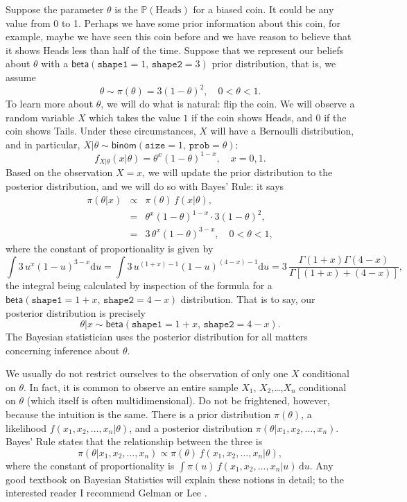 \documentclass[captions=tableheading]{scrbook}
\begin{document}
\begin{example}
Suppose the parameter \(\theta\) is the \(\mathbb{P}(\mbox{Heads})\) for a biased coin. It could be any value from 0 to 1. Perhaps we have some prior information about this coin, for example, maybe we have seen this coin before and we have reason to believe that it shows Heads less than half of the time. Suppose that we represent our beliefs about \(\theta\) with a \(\mathsf{beta}(\mathtt{shape1}=1,\,\mathtt{shape2}=3)\) prior distribution, that is, we assume 
\[
\theta\sim\pi(\theta)=3(1-\theta)^{2},\quad 0 < \theta < 1.
\]
To learn more about \(\theta\), we will do what is natural: flip the coin. We will observe a random variable \(X\) which takes the value \(1\) if the coin shows Heads, and 0 if the coin shows Tails. Under these circumstances, \(X\) will have a Bernoulli distribution, and in particular, \(X|\theta\sim\mathsf{binom}(\mathtt{size}=1,\,\mathtt{prob}=\theta)\):
\[ 
f_{X|\theta}(x|\theta)=\theta^{x}(1-\theta)^{1-x},\quad x=0,1.
\]
Based on the observation \(X=x\), we will update the prior distribution to the posterior distribution, and we will do so with Bayes' Rule: it says
\begin{eqnarray*}
\pi(\theta|x) & \propto & \pi(\theta)\, f(x|\theta),\\
 & = & \theta^{x}(1-\theta)^{1-x}\cdot3(1-\theta)^{2},\\
 & = & 3\,\theta^{x}(1-\theta)^{3-x},\quad 0 < \theta < 1,
\end{eqnarray*}
where the constant of proportionality is given by
\[
\int3\, u^{x}(1-u)^{3-x}\mathrm{d} u=\int3\, u^{(1+x)-1}(1-u)^{(4-x)-1}\mathrm{d} u=3\,\frac{\Gamma(1+x)\Gamma(4-x)}{\Gamma[(1+x)+(4-x)]},
\]
the integral being calculated by inspection of the formula for a \(\mathsf{beta}(\mathtt{shape1}=1+x,\,\mathtt{shape2}=4-x)\) distribution. That is to say, our posterior distribution is precisely
\[
\theta|x\sim\mathsf{beta}(\mathtt{shape1}=1+x,\,\mathtt{shape2}=4-x).
\]
The Bayesian statistician uses the posterior distribution for all matters concerning inference about \(\theta\).

\end{example}

\begin{rem}
We usually do not restrict ourselves to the observation of only one \(X\) conditional on \(\theta\). In fact, it is common to observe an entire sample \(X_{1}\), \(X_{2}\),\ldots{},\(X_{n}\) conditional on \(\theta\) (which itself is often multidimensional). Do not be frightened, however, because the intuition is the same. There is a prior distribution \(\pi(\theta)\), a likelihood \(f(x_{1},x_{2},\ldots,x_{n}|\theta)\), and a posterior distribution \(\pi(\theta|x_{1},x_{2},\ldots,x_{n})\). Bayes' Rule states that the relationship between the three is
\[
\pi(\theta|x_{1},x_{2},\ldots,x_{n})\propto\pi(\theta)\, f(x_{1},x_{2},\ldots,x_{n}|\theta),
\]
where the constant of proportionality is \(\int\pi(u)\, f(x_{1},x_{2},\ldots,x_{n}|u)\,\mathrm{d} u\). Any good textbook on Bayesian Statistics will explain these notions in detail; to the interested reader I recommend Gelman \cite{Gelman2004} or Lee \cite{Lee1997}.
\end{rem}
\end{document}
